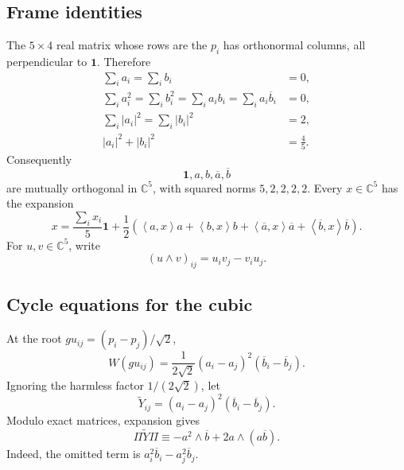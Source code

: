 \documentclass[11pt,reqno]{amsart}
\theoremstyle{remark}
\newcommand{\C}{\mathbb C}
\newcommand{\one}{\mathbf 1}
\newcommand{\ip}[2]{\left\langle #1,#2\right\rangle}
\newcommand{\abs}[1]{\left\lvert #1\right\rvert}
\begin{document}
\subsection{Frame identities}

The $5\times4$ real matrix whose rows are the $p_i$ has orthonormal columns,
all perpendicular to $\one$.  Therefore
\begin{align}
\sum_i a_i=\sum_i b_i&=0,\label{eq:frame-sums}\\
\sum_i a_i^2=\sum_i b_i^2
=\sum_i a_ib_i=\sum_i a_i\overline b_i&=0,\label{eq:frame-orthog}\\
\sum_i\abs{a_i}^2=\sum_i\abs{b_i}^2&=2,\label{eq:frame-norms}\\
\abs{a_i}^2+\abs{b_i}^2&=\frac45.\label{eq:row-norm}
\end{align}
Consequently
\[
\one,a,b,\overline a,\overline b
\]
are mutually orthogonal in $\C^5$, with squared norms $5,2,2,2,2$.
Every $x\in\C^5$ has the expansion
\begin{equation}\label{eq:basis-expansion}
x=\frac{\sum_i x_i}{5}\one
+\frac12\left(
\ip{a}{x}a+\ip{b}{x}b
+\ip{\overline a}{x}\overline a
+\ip{\overline b}{x}\overline b
\right).
\end{equation}
For $u,v\in\C^5$, write
\[
(u\wedge v)_{ij}=u_iv_j-v_iu_j.
\]

\subsection{Cycle equations for the cubic}

At the root $gu_{ij}=(p_i-p_j)/\sqrt2$,
\[
W(gu_{ij})
=\frac1{2\sqrt2}(a_i-a_j)^2(\overline b_i-\overline b_j).
\]
Ignoring the harmless factor $1/(2\sqrt2)$, let
\[
\widetilde Y_{ij}=(a_i-a_j)^2(\overline b_i-\overline b_j).
\]
Modulo exact matrices, expansion gives
\begin{equation}\label{eq:cubic-cycle-form}
\Pi\widetilde Y\Pi
\equiv -a^2\wedge\overline b+2a\wedge(a\overline b).
\end{equation}
Indeed, the omitted term is
$a_i^2\overline b_i-a_j^2\overline b_j$.
\end{document}
